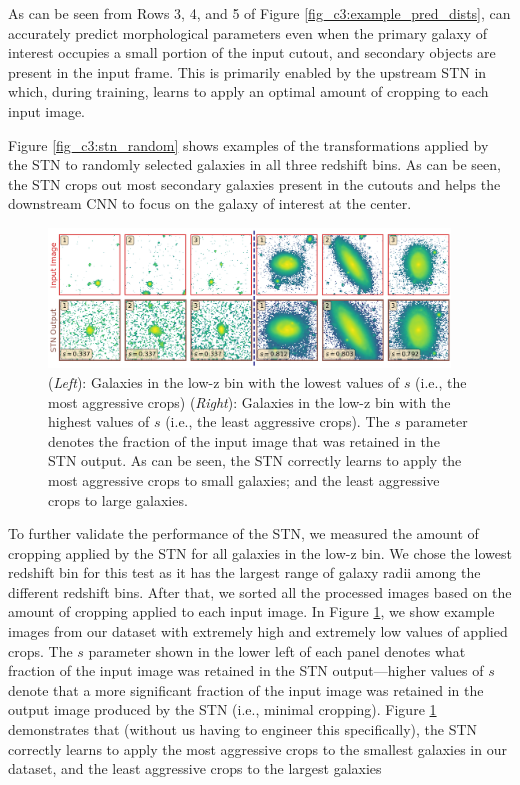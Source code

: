 As can be seen from Rows 3, 4, and 5 of Figure \ref{fig_c3:example_pred_dists}, \gampen{} can accurately predict morphological parameters even when the primary galaxy of interest occupies a small portion of the input cutout, and secondary objects are present in the input frame. This is primarily enabled by the upstream STN in \gampen{} which, during training, learns to apply an optimal amount of cropping to each input image. 

Figure \ref{fig_c3:stn_random} shows examples of the transformations applied by the STN to randomly selected galaxies in all three redshift bins. As can be seen, the STN crops out most secondary galaxies present in the cutouts and helps the downstream CNN to focus on the galaxy of interest at the center.

\begin{figure}[htb]
    \centering
    \includegraphics[width = 0.95\textwidth]{stn_min_max.png}
    \caption{(\textit{Left}): Galaxies in the low-z bin  with the lowest values of $s$ (i.e., the most aggressive crops) (\textit{Right}): Galaxies in the low-z bin with the highest values of $s$ (i.e., the least aggressive crops). The $s$ parameter denotes the fraction of the input image that was retained in the STN output. As can be seen, the STN correctly learns to apply the most aggressive crops to small galaxies; and the least aggressive crops to large galaxies.}
    \label{fig_c3:stn_min_max}
\end{figure}

To further validate the performance of the STN, we measured the amount of cropping applied by the STN for all galaxies in the low-z bin. We chose the lowest redshift bin for this test as it has the largest range of galaxy radii among the different redshift bins. After that, we sorted all the processed images based on the amount of cropping applied to each input image. In Figure \ref{fig_c3:stn_min_max}, we show example images from our dataset with extremely high and extremely low values of applied crops. The $s$ parameter shown in the lower left of each panel denotes what fraction of the input image was retained in the STN output---higher values of $s$ denote that a more significant fraction of the input image was retained in the output image produced by the STN  (i.e., minimal cropping). Figure \ref{fig_c3:stn_min_max} demonstrates that (without us having to engineer this specifically), the STN correctly learns to apply the most aggressive crops to the smallest galaxies in our dataset, and the least aggressive crops to the largest galaxies

